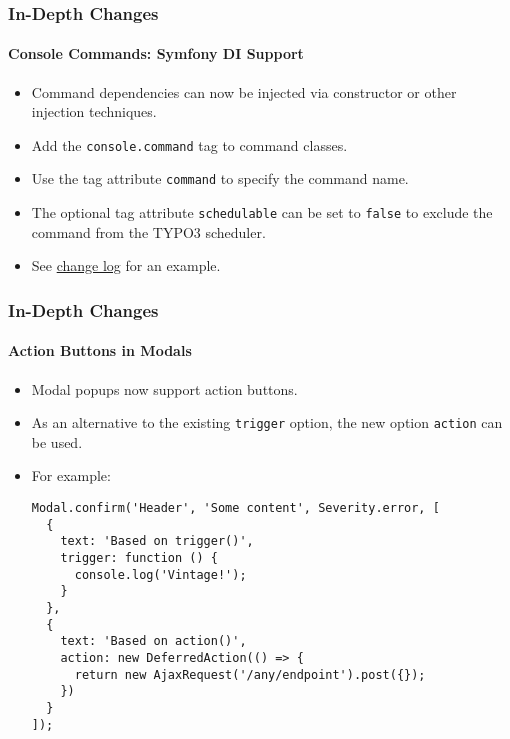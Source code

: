 \begin{frame}[fragile]
	\frametitle{In-Depth Changes}
	\framesubtitle{Console Commands: Symfony DI Support}

	\begin{itemize}
		\item Command dependencies can now be injected via constructor or other injection techniques.
		\item Add the \texttt{console.command} tag to command classes.
		\item Use the tag attribute \texttt{command} to specify the command name.
		\item The optional tag attribute \texttt{schedulable} can be set to \texttt{false}
			to exclude the command from the TYPO3 scheduler.

		\item See
			\href{https://docs.typo3.org/c/typo3/cms-core/master/en-us/Changelog/10.3/Feature-89139-AddDependencyInjectionSupportForConsoleCommands.html}{change log}
			for an example.
	\end{itemize}

\end{frame}


\begin{frame}[fragile]
	\frametitle{In-Depth Changes}
	\framesubtitle{Action Buttons in Modals}

	\lstset{basicstyle=\tiny\ttfamily}

	\begin{itemize}
		\item Modal popups now support action buttons.
		\item As an alternative to the existing \texttt{trigger} option, the new option
			\texttt{action} can be used.
		\item For example:
\begin{lstlisting}
Modal.confirm('Header', 'Some content', Severity.error, [
  {
    text: 'Based on trigger()',
    trigger: function () {
      console.log('Vintage!');
    }
  },
  {
    text: 'Based on action()',
    action: new DeferredAction(() => {
      return new AjaxRequest('/any/endpoint').post({});
    })
  }
]);
\end{lstlisting}

	\end{itemize}

\end{frame}

